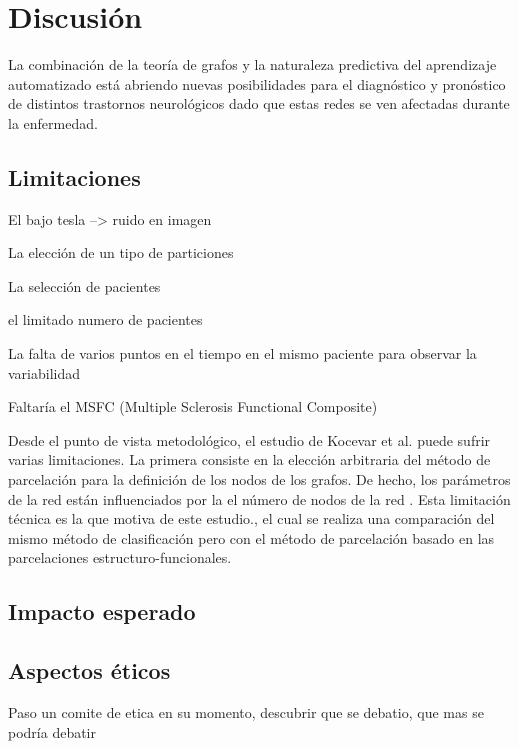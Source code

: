 \documentclass[fleqn,12pt]{UICArticle} %
\begin{document}
\section{Discusión}

La combinación de la teoría de grafos y la naturaleza predictiva del aprendizaje automatizado está abriendo nuevas posibilidades para el diagnóstico y pronóstico de distintos trastornos neurológicos dado que estas redes se ven afectadas durante la enfermedad. 


\subsection{Limitaciones}

\begin{list}{-}
\item El bajo tesla --> ruido en imagen
\item La elección de un tipo de particiones
\item La selección de pacientes
\item el limitado numero de pacientes
\item La falta de varios puntos en el tiempo en el mismo paciente para observar la variabilidad
\item Faltaría el MSFC (Multiple Sclerosis Functional Composite)
\end{list}

Desde el punto de vista metodológico, el estudio de Kocevar et al. \cite{Kocevar2016} puede sufrir varias limitaciones. La primera consiste en la elección arbitraria del método de parcelación para la definición de los nodos de los grafos. De hecho, los parámetros de la red están influenciados por la el número de nodos de la red \cite{Zalesky2010}. Esta limitación técnica es la que motiva  de este estudio., el cual se realiza una comparación del mismo método de clasificación pero con el método de parcelación basado en las parcelaciones estructuro-funcionales.


\subsection{Impacto esperado}

\subsection{Aspectos éticos}
Paso un comite de etica en su momento, descubrir que se debatio, que mas se podría debatir
\end{document}
